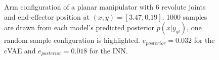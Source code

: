 \documentclass[conference]{IEEEtran}
\begin{document}
\begin{figure}[tbh]
\centering

    \caption{\label{fig:posterior:6dof} Arm configuration of a planar manipulator with $6$ revolute joints and end-effector position at $(x, y) = [3.47, 0.19]$. 1000 samples are drawn from each model's predicted posterior $\tilde{p}(x | y_{gt})$, one random sample configuration is highlighted. $e_{posterior} = 0.032$ for the cVAE and $e_{posterior} = 0.018$ for the INN.}
\end{figure}
\end{document}
